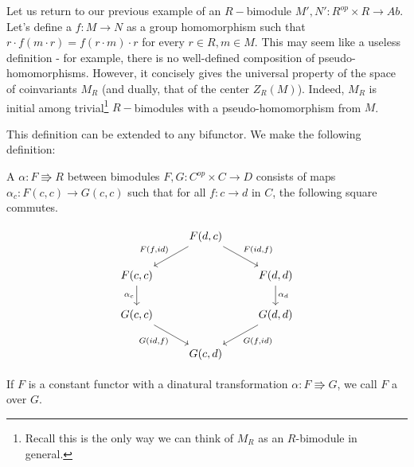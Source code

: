 Let us return to our previous example of an $R-$bimodule $M',N':R^{op}\times R\rightarrow Ab$. Let's define a  $f:M\rightarrow N$ as a group homomorphism such that $r\cdot f(m\cdot r)=f(r\cdot m)\cdot r$ for every $r\in R, m\in M$. This may seem like a useless definition - for example, there is no well-defined composition of pseudo-homomorphisms. However, it concisely gives the universal property of the space of coinvariants $M_R$ (and dually, that of the center $Z_R(M)$). Indeed, $M_R$ is initial among trivial\footnote{Recall this is the only way we can think of $M_R$ as an $R$-bimodule in general.} $R-$bimodules with a pseudo-homomorphism from $M$.

This definition can be extended to any bifunctor. We make the following definition:
\begin{definition}
A  $\alpha:F\Rrightarrow R$ between bimodules $F,G:C^{op}\times C\rightarrow D$ consists of maps $\alpha_c:F(c,c)\rightarrow G(c,c)$ such that for all $f:c\rightarrow d$ in $C$, the following square commutes.

\[\begin{tikzcd}
                                  & {F(d,c)} \arrow[ld, "{F(f,id)}"'] \arrow[rd, "{F(id,f)}"] &                                  \\
{F(c,c)} \arrow[d, "\alpha_c"']   &                                                           & {F(d,d)} \arrow[d, "\alpha_d"]   \\
{G(c,c)} \arrow[rd, "{G(id,f)}"'] &                                                           & {G(d,d)} \arrow[ld, "{G(f,id)}"] \\
                                  & {G(c,d)}                                                  &                                 
\end{tikzcd}\]

If $F$ is a constant functor with a dinatural transformation $\alpha:F \Rrightarrow G$, we call $F$ a  over $G$.
\end{definition}

